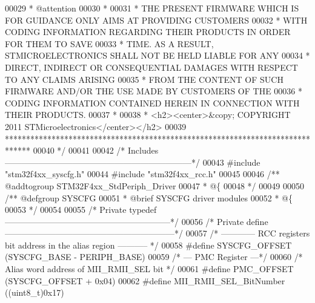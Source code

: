\begin{DoxyCode}
00029 \textcolor{comment}{  * @attention}
00030 \textcolor{comment}{  *}
00031 \textcolor{comment}{  * THE PRESENT FIRMWARE WHICH IS FOR GUIDANCE ONLY AIMS AT PROVIDING CUSTOMERS}
00032 \textcolor{comment}{  * WITH CODING INFORMATION REGARDING THEIR PRODUCTS IN ORDER FOR THEM TO SAVE}
00033 \textcolor{comment}{  * TIME. AS A RESULT, STMICROELECTRONICS SHALL NOT BE HELD LIABLE FOR ANY}
00034 \textcolor{comment}{  * DIRECT, INDIRECT OR CONSEQUENTIAL DAMAGES WITH RESPECT TO ANY CLAIMS ARISING}
00035 \textcolor{comment}{  * FROM THE CONTENT OF SUCH FIRMWARE AND/OR THE USE MADE BY CUSTOMERS OF THE}
00036 \textcolor{comment}{  * CODING INFORMATION CONTAINED HEREIN IN CONNECTION WITH THEIR PRODUCTS.}
00037 \textcolor{comment}{  *}
00038 \textcolor{comment}{  * <h2><center>&copy; COPYRIGHT 2011 STMicroelectronics</center></h2>}
00039 \textcolor{comment}{  ******************************************************************************}
00040 \textcolor{comment}{  */}
00041 
00042 \textcolor{comment}{/* Includes ------------------------------------------------------------------*/}
00043 \textcolor{preprocessor}{#}\textcolor{preprocessor}{include} "stm32f4xx_syscfg.h"
00044 \textcolor{preprocessor}{#}\textcolor{preprocessor}{include} "stm32f4xx_rcc.h"
00045 
00046 \textcolor{comment}{/** @addtogroup STM32F4xx\_StdPeriph\_Driver}
00047 \textcolor{comment}{  * @\{}
00048 \textcolor{comment}{  */}
00049 
00050 \textcolor{comment}{/** @defgroup SYSCFG }
00051 \textcolor{comment}{  * @brief SYSCFG driver modules}
00052 \textcolor{comment}{  * @\{}
00053 \textcolor{comment}{  */}
00054 
00055 \textcolor{comment}{/* Private typedef -----------------------------------------------------------*/}
00056 \textcolor{comment}{/* Private define ------------------------------------------------------------*/}
00057 \textcolor{comment}{/* ------------ RCC registers bit address in the alias region ----------- */}
00058 \textcolor{preprocessor}{#}\textcolor{preprocessor}{define} \textcolor{preprocessor}{SYSCFG\_OFFSET}             \textcolor{preprocessor}{(}SYSCFG_BASE \textcolor{preprocessor}{-} PERIPH_BASE\textcolor{preprocessor}{)}
00059 \textcolor{comment}{/* ---  PMC Register ---*/}
00060 \textcolor{comment}{/* Alias word address of MII\_RMII\_SEL bit */}
00061 \textcolor{preprocessor}{#}\textcolor{preprocessor}{define} \textcolor{preprocessor}{PMC\_OFFSET}                \textcolor{preprocessor}{(}SYSCFG_OFFSET \textcolor{preprocessor}{+} 0x04\textcolor{preprocessor}{)}
00062 \textcolor{preprocessor}{#}\textcolor{preprocessor}{define} \textcolor{preprocessor}{MII\_RMII\_SEL\_BitNumber}    \textcolor{preprocessor}{(}\textcolor{preprocessor}{(}\textcolor{preprocessor}{uint8\_t}\textcolor{preprocessor}{)}0x17\textcolor{preprocessor}{)}

\end{DoxyCode}
